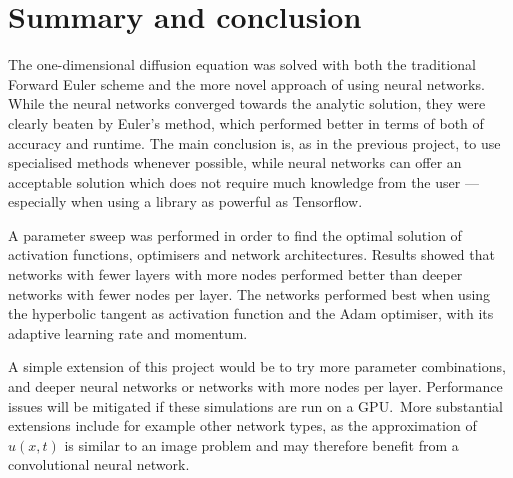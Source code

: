 \documentclass[11pt,british,a4paper]{article}
\numberwithin{equation}{section}
\begin{document}
\section{Summary and conclusion}
The one-dimensional diffusion equation was solved with both the traditional Forward Euler scheme and the more novel approach of using neural networks. While the neural networks converged towards the analytic solution, they were clearly beaten by Euler's method, which performed better in terms of both of accuracy and runtime. The main conclusion is, as in the previous project, to use specialised methods whenever possible, while neural networks can offer an acceptable solution which does not require much knowledge from the user --- especially when using a library as powerful as Tensorflow.

A parameter sweep was performed in order to find the optimal solution of activation functions, optimisers and network architectures. Results showed that networks with fewer layers with more nodes performed better than deeper networks with fewer nodes per layer. The networks performed best when using the hyperbolic tangent as activation function and the Adam optimiser, with its adaptive learning rate and momentum.

A simple extension of this project would be to try more parameter combinations, and deeper neural networks or networks with more nodes per layer. Performance issues will be mitigated if these simulations are run on a GPU.\ More substantial extensions include for example other network types, as the approximation of \(u(x,t)\) is similar to an image problem and may therefore benefit from a convolutional neural network.



\nocite{*}
\printbibliography{}
\end{document}
